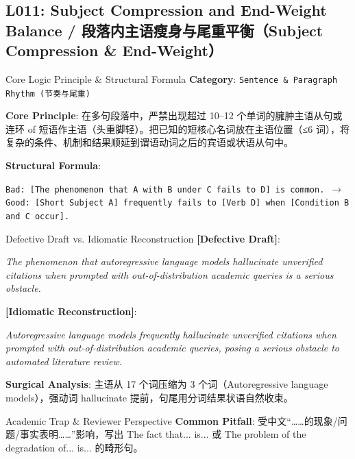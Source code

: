 \subsection{L011: Subject Compression and End-Weight Balance / 段落内主语瘦身与尾重平衡（Subject Compression \& End-Weight）}\label{sec:logic:L011}
\begin{ConceptBox}{Core Logic Principle \& Structural Formula}
\textbf{Category}: \texttt{Sentence \& Paragraph Rhythm (节奏与尾重)}\par\vspace{3pt}
\textbf{Core Principle}: 在多句段落中，严禁出现超过 10--12 个单词的臃肿主语从句或连环 of 短语作主语（头重脚轻）。把已知的短核心名词放在主语位置（≤6 词），将复杂的条件、机制和结果顺延到谓语动词之后的宾语或状语从句中。\par\vspace{4pt}
\textbf{Structural Formula}:\par\noindent\texttt{Bad: [The phenomenon that A with B under C fails to D] is common. $\to$ Good: [Short Subject A] frequently fails to [Verb D] when [Condition B and C occur].}
\end{ConceptBox}
\begin{ExampleBox}{Defective Draft vs. Idiomatic Reconstruction}
\textbf{\color{TargetHighlight}[Defective Draft]}:\par\textit{The phenomenon that autoregressive language models hallucinate unverified citations when prompted with out-of-distribution academic queries is a serious obstacle.}\par\vspace{4pt}
\textbf{\color{AcadNavy}[Idiomatic Reconstruction]}:\par\textit{Autoregressive language models frequently hallucinate unverified citations when prompted with out-of-distribution academic queries, posing a serious obstacle to automated literature review.}\par\vspace{4pt}
\textbf{Surgical Analysis}: 主语从 17 个词压缩为 3 个词（Autoregressive language models），强动词 hallucinate 提前，句尾用分词结果状语自然收束。
\end{ExampleBox}
\begin{TipBox}{Academic Trap \& Reviewer Perspective}
\textbf{Common Pitfall}: 受中文“……的现象/问题/事实表明……”影响，写出 The fact that... is... 或 The problem of the degradation of... is... 的畸形句。
\end{TipBox}
\vspace{6pt}
